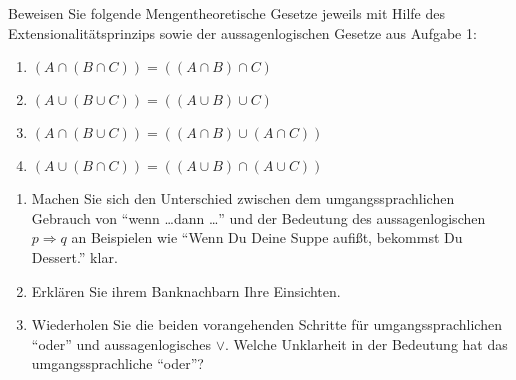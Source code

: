 
Beweisen Sie folgende Mengentheoretische Gesetze jeweils mit Hilfe des Extensionalitätsprinzips sowie der aussagenlogischen Gesetze aus Aufgabe 1:
\begin{enumerate}
\item $(A\cap(B\cap C))=((A\cap B)\cap C)$
\item $(A\cup(B\cup C))=((A\cup B)\cup C)$
\item $(A\cap(B\cup C))=((A\cap B)\cup(A\cap C))$
\item $(A\cup(B\cap C))=((A\cup B)\cap(A\cup C))$
\end{enumerate}




\begin{enumerate}
\item Machen Sie sich den Unterschied zwischen dem umgangssprachlichen Gebrauch von ``wenn \ldots dann \ldots'' und der Bedeutung des aussagenlogischen $p\Rightarrow q$ an Beispielen wie ``Wenn Du Deine Suppe aufißt, bekommst Du Dessert.'' klar.
\item Erklären Sie ihrem Banknachbarn Ihre Einsichten.
\item Wiederholen Sie die beiden vorangehenden Schritte für umgangssprachlichen ``oder'' und aussagenlogisches $\vee$. Welche Unklarheit in der Bedeutung hat das umgangssprachliche ``oder''?
\end{enumerate}
